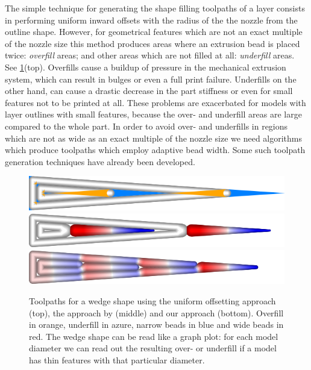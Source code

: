 The simple technique for generating the shape filling toolpaths of a layer consists in performing uniform inward offsets with the radius of the the nozzle from the outline shape.
However, for geometrical features which are not an exact multiple of the nozzle size this method produces areas where an extrusion bead is placed twice: \emph{overfill} areas; and other areas which are not filled at all: \emph{underfill} areas.
See \cref{intro_wedge}(top).
Overfills cause a buildup of pressure in the mechanical extrusion system, which can result in bulges or even a full print failure.
Underfills on the other hand, can cause a drastic decrease in the part stiffness or even for small features not to be printed at all.
These problems are exacerbated for models with layer outlines with small features, because the over- and underfill areas are large compared to the whole part.
In order to avoid over- and underfills in regions which are not as wide as an exact multiple of the nozzle size we need algorithms which produce toolpaths which employ adaptive bead width.
Some such toolpath generation techniques have already been developed.

\begin{figure}\centering
\includegraphics[width=\columnwidth]{sources/intro/TEST_naive_accuracy.png}
\includegraphics[width=\columnwidth]{sources/intro/TEST_Center_widths.png}
\includegraphics[width=\columnwidth]{sources/intro/TEST_InwardDistributed_widths.png}
\caption{
Toolpaths for a wedge shape using the uniform offsetting approach (top), the approach by \citeauthor{Jin2017JMS}(middle) and our approach (bottom).
Overfill in orange, underfill in azure, narrow beads in blue and wide beads in red.
The wedge shape can be read like a graph plot: for each model diameter we can read out the resulting over- or underfill if a model has thin features with that particular diameter.
}
\label{intro_wedge}
\end{figure}



